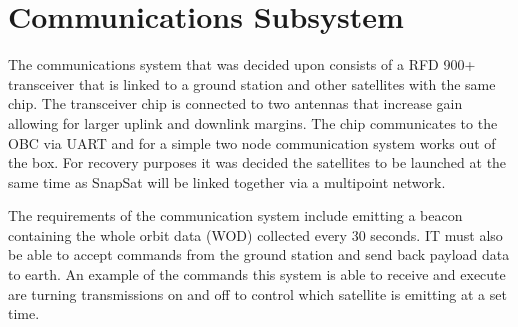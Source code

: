 \section{Communications Subsystem}
The communications system that was decided upon consists of a RFD 900+ transceiver that is linked to a ground station and other satellites with the same chip. The transceiver chip is connected to two antennas that increase gain allowing for larger uplink and downlink margins. The chip communicates to the OBC via UART and for a simple two node communication system works out of the box. For recovery purposes it was decided the satellites to be launched at the same time as SnapSat will be linked together via a multipoint network. 

\noindent
The requirements of the communication system include emitting a beacon containing the whole orbit data (WOD) collected every 30 seconds. IT must also be able to accept commands from the ground station and send back payload data to earth. An example of the commands this system is able to receive and execute are turning transmissions on and off to control which satellite is emitting at a set time.

